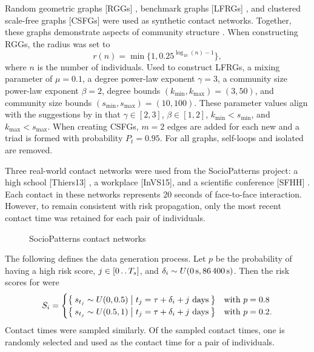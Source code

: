 Random geometric graphs [RGGs] \citep{Dall2002}, benchmark graphs [LFRGs] \citep{Lancichinetti2008}, and clustered scale-free graphs [CSFGs] \citep{Holme2002} were used as synthetic contact networks. Together, these graphs demonstrate aspects of community structure \citep{Fortunato2010}. When constructing RGGs, the radius was set to
\begin{equation*}
  r(n) = \min \{1, 0.25^{\log_{10}(n) - 1}\},
\end{equation*}
where $n$ is the number of individuals. Used to construct LFRGs, a mixing parameter of $\mu = 0.1$, a degree power-law exponent $\gamma = 3$, a community size power-law exponent $\beta = 2$, degree bounds $(k_{\min}, k_{\max}) = (3, 50)$, and community size bounds $(s_{\min}, s_{\max}) = (10, 100)$. These parameter values align with the suggestions by \citet{Lancichinetti2008} in that $\gamma \in [2, 3]$,  $\beta \in [1, 2]$, $k_{\min} < s_{\min}$, and $k_{\max} < s_{\max}$. When creating CSFGs, $m = 2$ edges are added for each new \vertexName{} and a triad is formed with probability $P_t = 0.95$. For all graphs, self-loops and isolated \verticesName{} are removed.

Three real-world contact networks were used from the SocioPatterns project: a high school [Thiers13] \citep{Fournet2014}, a workplace [InVS15], and a scientific conference [SFHH] \citep{G_enois2018}. Each contact in these networks represents 20 seconds of face-to-face interaction. However, to remain consistent with risk propagation, only the most recent contact time was retained for each pair of individuals.

\begin{figure}[htbp]
\centering
{}
\caption{SocioPatterns contact networks}
\label{fig:real-networks}
\end{figure}

The following defines the data generation process. Let $p$ be the probability of having a high risk score, $j \in [0 \mathinner {\ldotp \ldotp} T_s]$, and $\delta_i \sim U(\qty{0}{\second}, \qty{86400}{\second})$. Then the risk scores for  were
\begin{equation*}
  S_i = 
    \begin{cases}
      \Set{ s_{t_j} \sim U(0, 0.5) |  t_j = \tau+ \delta_i + j \text{ days}} & \text{with } p = 0.8 \\
      \Set{ s_{t_j} \sim U(0.5, 1) | t_j = \tau+ \delta_i + j \text{ days}} & \text{with } p = 0.2.
    \end{cases}
\end{equation*}
Contact times were sampled similarly. Of the sampled contact times, one is randomly selected and used as the contact time for a pair of individuals.

